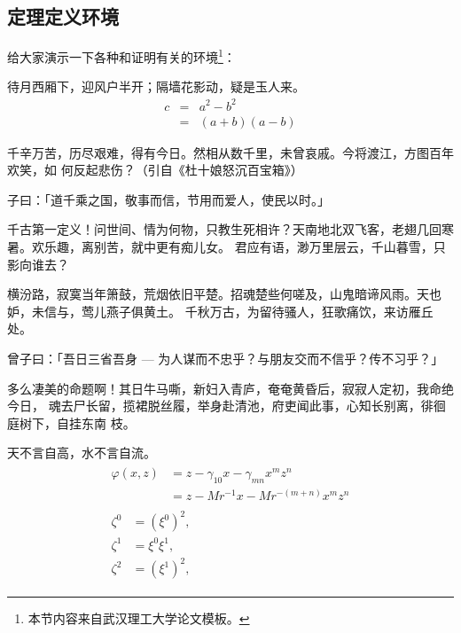 \subsection{定理定义环境}
给大家演示一下各种和证明有关的环境\footnote{本节内容来自武汉理工大学论文模板。}：

\begin{assumption}
待月西厢下，迎风户半开；隔墙花影动，疑是玉人来。
\begin{eqnarray}
  \label{eq:eqnxmp}
  c & = & a^2 - b^2\\
    & = & (a+b)(a-b)
\end{eqnarray}
\end{assumption}

千辛万苦，历尽艰难，得有今日。然相从数千里，未曾哀戚。今将渡江，方图百年欢笑，如
何反起悲伤？（引自《杜十娘怒沉百宝箱》）

\begin{definition}
子曰：「道千乘之国，敬事而信，节用而爱人，使民以时。」
\end{definition}

千古第一定义！问世间、情为何物，只教生死相许？天南地北双飞客，老翅几回寒暑。欢乐趣，离别苦，就中更有痴儿女。
君应有语，渺万里层云，千山暮雪，只影向谁去？

横汾路，寂寞当年箫鼓，荒烟依旧平楚。招魂楚些何嗟及，山鬼暗谛风雨。天也妒，未信与，莺儿燕子俱黄土。
千秋万古，为留待骚人，狂歌痛饮，来访雁丘处。

\begin{proposition}
 曾子曰：「吾日三省吾身 --- 为人谋而不忠乎？与朋友交而不信乎？传不习乎？」
\end{proposition}

多么凄美的命题啊！其日牛马嘶，新妇入青庐，奄奄黄昏后，寂寂人定初，我命绝今日，
魂去尸长留，揽裙脱丝履，举身赴清池，府吏闻此事，心知长别离，徘徊庭树下，自挂东南
枝。

\begin{remark}
天不言自高，水不言自流。
\begin{gather*}
\begin{split} 
\varphi(x,z)
&=z-\gamma_{10}x-\gamma_{mn}x^mz^n\\
&=z-Mr^{-1}x-Mr^{-(m+n)}x^mz^n
\end{split}\\[6pt]
\begin{align} \zeta^0&=(\xi^0)^2,\\
\zeta^1 &=\xi^0\xi^1,\\
\zeta^2 &=(\xi^1)^2,
\end{align}
\end{gather*}
\end{remark}

